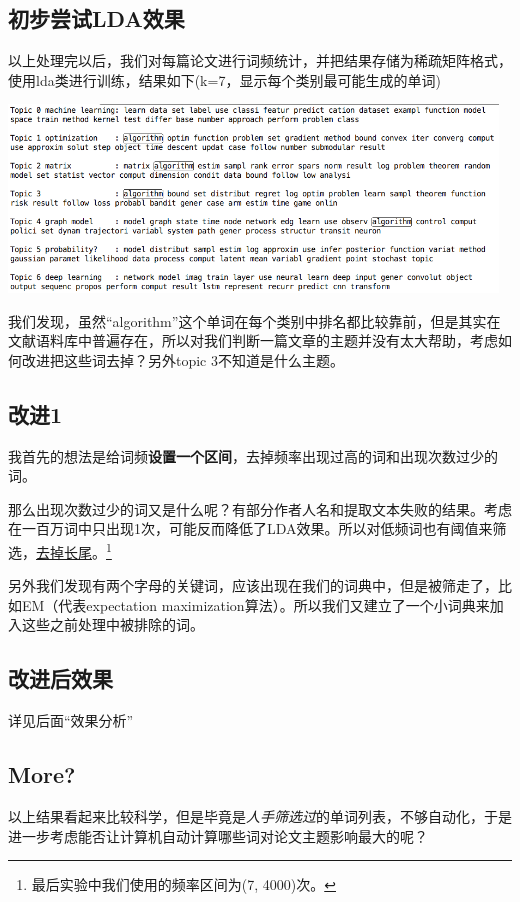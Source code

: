 \documentclass{article}
\begin{document}
\subsection{初步尝试LDA效果}
以上处理完以后，我们对每篇论文进行词频统计，并把结果存储为稀疏矩阵格式，使用lda类进行训练，结果如下(k=7，显示每个类别最可能生成的单词)

\begin{center}
\includegraphics[width=13cm]{section3/result1}
\end{center}

我们发现，虽然``algorithm''这个单词在每个类别中排名都比较靠前，但是其实在文献语料库中普遍存在，所以对我们判断一篇文章的主题并没有太大帮助，考虑如何改进把这些词去掉？另外topic 3不知道是什么主题。

\subsection{改进1}
我首先的想法是给词频\textbf{设置一个区间}，去掉频率出现过高的词和出现次数过少的词。

那么出现次数过少的词又是什么呢？有部分作者人名和提取文本失败的结果。考虑在一百万词中只出现1次，可能反而降低了LDA效果。所以对低频词也有阈值来筛选，\underline{去掉长尾}。\footnote{最后实验中我们使用的频率区间为(7, 4000)次。}

另外我们发现有两个字母的关键词，应该出现在我们的词典中，但是被筛走了，比如EM（代表expectation maximization算法）。所以我们又建立了一个小词典来加入这些之前处理中被排除的词。

\subsection{改进后效果}
详见后面``效果分析''
\subsection{More?}
以上结果看起来比较科学，但是毕竟是\emph{人手筛选过}的单词列表，不够自动化，于是进一步考虑能否让计算机自动计算哪些词对论文主题影响最大的呢？
\end{document}
